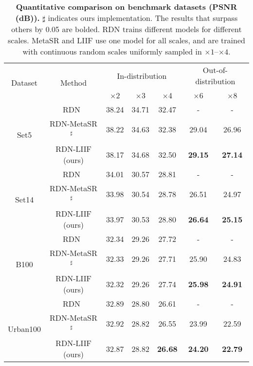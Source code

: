 \documentclass[final]{cvpr}
\begin{document}
\begin{table*}[]
    \centering
    \begin{tabular}{c|c|ccc|cc}
        \multirow{2}{*}{Dataset} & \multirow{2}{*}{Method} & \multicolumn{3}{c|}{In-distribution} & \multicolumn{2}{c}{Out-of-distribution} \\
        & & $\times$2 & $\times$3 & $\times$4 & $\times$6 & $\times$8 \\
        \hline
        \multirow{3}{*}{Set5} & RDN~\cite{zhang2018residual} & 38.24 & 34.71 & 32.47 & - & - \\
        & RDN-MetaSR$^\sharp$~\cite{hu2019meta} & 38.22 & 34.63 & 32.38 & 29.04 & 26.96 \\
        & RDN-LIIF (ours) & 38.17 & 34.68 & 32.50 & \textbf{29.15} & \textbf{27.14} \\
        \hline
        \multirow{3}{*}{Set14} & RDN~\cite{zhang2018residual} & 34.01 & 30.57 & 28.81 & - & - \\
        & RDN-MetaSR$^\sharp$~\cite{hu2019meta} & 33.98 & 30.54 & 28.78 & 26.51 & 24.97 \\
        & RDN-LIIF (ours) & 33.97 & 30.53 & 28.80 & \textbf{26.64} & \textbf{25.15} \\
        \hline
        \multirow{3}{*}{B100} & RDN~\cite{zhang2018residual} & 32.34 & 29.26 & 27.72 & - & - \\
        & RDN-MetaSR$^\sharp$~\cite{hu2019meta} & 32.33 & 29.26 & 27.71 & 25.90 & 24.83 \\
        & RDN-LIIF (ours) & 32.32 & 29.26 & 27.74 & \textbf{25.98} & \textbf{24.91} \\
        \hline
        \multirow{3}{*}{Urban100} & RDN~\cite{zhang2018residual} & 32.89 & 28.80 & 26.61 & - & - \\
        & RDN-MetaSR$^\sharp$~\cite{hu2019meta} & 32.92 & 28.82 & 26.55 & 23.99 & 22.59 \\
        & RDN-LIIF (ours) & 32.87 & 28.82 & \textbf{26.68} & \textbf{24.20} & \textbf{22.79} \\
    \end{tabular}
    \caption{\textbf{Quantitative comparison on benchmark datasets (PSNR (dB)).} $\sharp$ indicates ours implementation. The results that surpass others by 0.05 are bolded. RDN trains different models for different scales. MetaSR and LIIF use one model for all scales, and are trained with continuous random scales uniformly sampled in $\times1$--$\times4$.}
    \label{tab:benchmark}
\end{table*}
\end{document}
